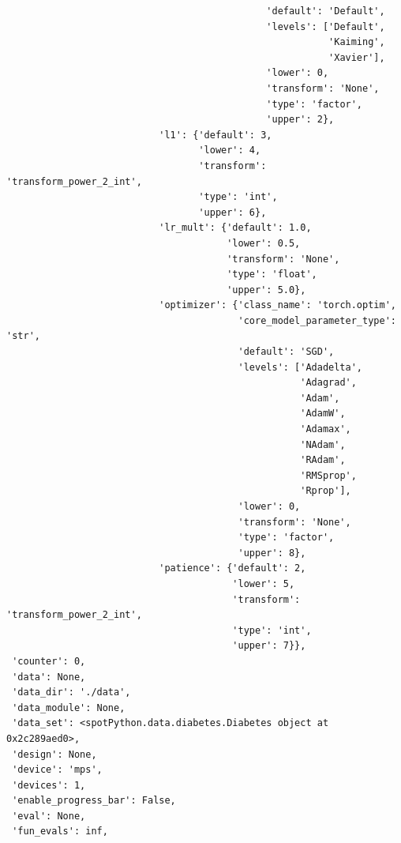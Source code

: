 \documentclass[
  letterpaper,
  DIV=11,
  numbers=noendperiod]{scrreprt}
\begin{document}
\begin{verbatim}
                                              'default': 'Default',
                                              'levels': ['Default',
                                                         'Kaiming',
                                                         'Xavier'],
                                              'lower': 0,
                                              'transform': 'None',
                                              'type': 'factor',
                                              'upper': 2},
                           'l1': {'default': 3,
                                  'lower': 4,
                                  'transform': 'transform_power_2_int',
                                  'type': 'int',
                                  'upper': 6},
                           'lr_mult': {'default': 1.0,
                                       'lower': 0.5,
                                       'transform': 'None',
                                       'type': 'float',
                                       'upper': 5.0},
                           'optimizer': {'class_name': 'torch.optim',
                                         'core_model_parameter_type': 'str',
                                         'default': 'SGD',
                                         'levels': ['Adadelta',
                                                    'Adagrad',
                                                    'Adam',
                                                    'AdamW',
                                                    'Adamax',
                                                    'NAdam',
                                                    'RAdam',
                                                    'RMSprop',
                                                    'Rprop'],
                                         'lower': 0,
                                         'transform': 'None',
                                         'type': 'factor',
                                         'upper': 8},
                           'patience': {'default': 2,
                                        'lower': 5,
                                        'transform': 'transform_power_2_int',
                                        'type': 'int',
                                        'upper': 7}},
 'counter': 0,
 'data': None,
 'data_dir': './data',
 'data_module': None,
 'data_set': <spotPython.data.diabetes.Diabetes object at 0x2c289aed0>,
 'design': None,
 'device': 'mps',
 'devices': 1,
 'enable_progress_bar': False,
 'eval': None,
 'fun_evals': inf,

\end{verbatim}
\end{document}
